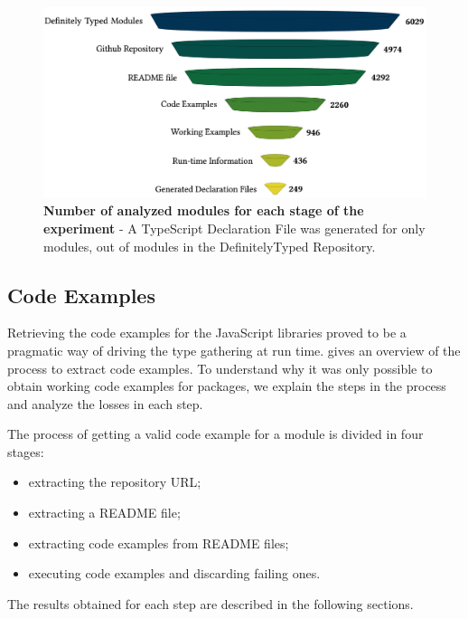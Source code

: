 \documentclass[sigconf]{acmart}
\begin{document}
\begin{figure}[tp]
  \centering
  \includegraphics[width=1\linewidth]{funnel.png}
  \caption[Number of analyzed modules for each stage of the experiment]{
    \textbf{Number of analyzed modules for each stage of the experiment} - 
  A TypeScript Declaration File was generated for only \CountModulesGeneratedDeclarationFile{} modules, out of \CountTotalModulesDefinitelyTyped{} modules in the DefinitelyTyped Repository. 
  } 
  \label{fig:experiments-overall-funnel}
\end{figure}

\subsection{Code Examples}
Retrieving the code examples for the JavaScript libraries proved to be
a pragmatic way of driving the type gathering at run time.
 gives an overview of the
process to extract code examples. To understand why it was only possible
to obtain working code examples for \CountModulesWithCodeExamples{}
packages, we explain the steps in the process and analyze the losses
in each step.

The process of getting a valid code example for a module is divided in four
stages: 
\begin{itemize}
\item extracting the repository URL;
\item extracting a README file;
\item extracting code examples from README files;
\item executing code examples and discarding failing ones.
\end{itemize}

The results obtained for each step are described in the
following sections. 
\end{document}
